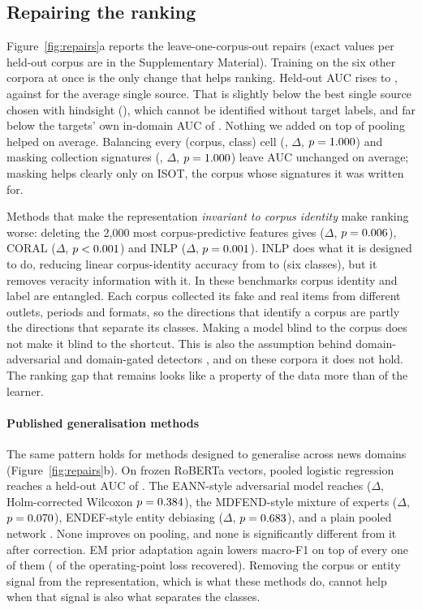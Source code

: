 \subsection{Repairing the ranking}\label{sec:repair-res}
Figure~\ref{fig:repairs}a reports the leave-one-corpus-out repairs (exact values per held-out corpus are in the Supplementary Material). Training on the six other corpora at once is the only change that helps ranking. Held-out AUC rises to \LocoPooled{}, against \LocoMeanSingle{} for the average single source. That is slightly below the best single source chosen with hindsight (\LocoBestSingle), which cannot be identified without target labels, and far below the targets' own in-domain AUC of \LocoCeiling{}. Nothing we added on top of pooling helped on average. Balancing every (corpus, class) cell (\LocoBal, $\Delta$\LocoBalDelta, $p=1.000$) and masking collection signatures (\LocoMask, $\Delta$\LocoMaskDelta, $p=1.000$) leave AUC unchanged on average; masking helps clearly only on ISOT, the corpus whose signatures it was written for.

Methods that make the representation \emph{invariant to corpus identity} make ranking worse: deleting the 2{,}000 most corpus-predictive features gives \LocoDrop{} ($\Delta$\LocoDropDelta, $p=0.006$), CORAL \LocoCORAL{} ($\Delta$\LocoCORALDelta, $p<0.001$) and INLP \LocoINLP{} ($\Delta$\LocoINLPDelta, $p=0.001$). INLP does what it is designed to do, reducing linear corpus-identity accuracy from \INLPaccBefore{} to \INLPaccAfter{} (six classes), but it removes veracity information with it. In these benchmarks corpus identity and label are entangled. Each corpus collected its fake and real items from different outlets, periods and formats, so the directions that identify a corpus are partly the directions that separate its classes. Making a model blind to the corpus does not make it blind to the shortcut. This is also the assumption behind domain-adversarial and domain-gated detectors \citep{wang2018eann,nan2021mdfend}, and on these corpora it does not hold. The ranking gap that remains looks like a property of the data more than of the learner.

\paragraph{Published generalisation methods}
The same pattern holds for methods designed to generalise across news domains (Figure~\ref{fig:repairs}b). On frozen RoBERTa vectors, pooled logistic regression reaches a held-out AUC of \DGERMlr{}. The EANN-style adversarial model reaches \DGEANN{} ($\Delta$\DGEANNDelta, Holm-corrected Wilcoxon $p=0.384$), the MDFEND-style mixture of experts \DGMDFEND{} ($\Delta$\DGMDFENDDelta, $p=0.070$), ENDEF-style entity debiasing \DGENDEF{} ($\Delta$\DGENDEFDelta, $p=0.683$), and a plain pooled network \DGERMmlp{}. None improves on pooling, and none is significantly different from it after correction. EM prior adaptation again lowers macro-F1 on top of every one of them (\DGrecEM{} of the operating-point loss recovered). Removing the corpus or entity signal from the representation, which is what these methods do, cannot help when that signal is also what separates the classes.

